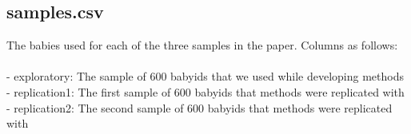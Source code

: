 \documentclass{article}
\begin{document}
\subsection*{samples.csv}

The babies used for each of the three samples in the paper. Columns as follows: \\\\
- exploratory: The sample of 600 babyids that we used while developing methods \\
- replication1: The first sample of 600 babyids that methods were replicated with  \\
- replication2: The second sample of 600 babyids that methods were replicated with

% 
\end{document}
